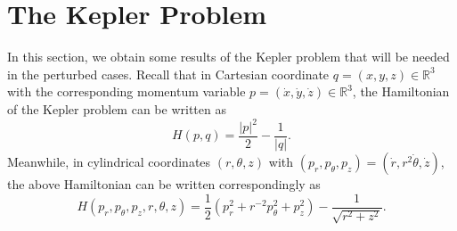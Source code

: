 \documentclass[11pt]{amsart}
\newcommand{\tht}{\theta}
\begin{document}
\section{The Kepler Problem}\label{sec:KP}%

In this section, we obtain some results of the Kepler problem that will be needed in the perturbed cases. Recall that in Cartesian coordinate $q=(x,y,z)\in\mathbb{R}^{3}$ with the corresponding momentum variable $p=(\dot{x},\dot{y},\dot{z})\in\mathbb{R}^{3}$, the Hamiltonian of the Kepler problem can be written as		    
\begin{equation}
	H(p,q)=\frac{|p|^2}{2}-\frac{1}{|q|}.
	\label{eq:spacial kepler Ham1}
\end{equation}
Meanwhile, in cylindrical coordinates $(r, \tht, z)$ with $(p_r,p_{\tht},p_z)=(\dot{r},r^2\dot{\tht},\dot{z})$, the above Hamiltonian can be written correspondingly as
\begin{equation*}
	H(p_r,p_{\tht},p_z,r,\tht,z)=\frac{1}{2}(p_{r}^{2}+r^{-2}p_{\tht}^2+p_{z}^{2})-\frac{1}{\sqrt{r^{2}+z^{2}}}.
\end{equation*} 
\end{document}
